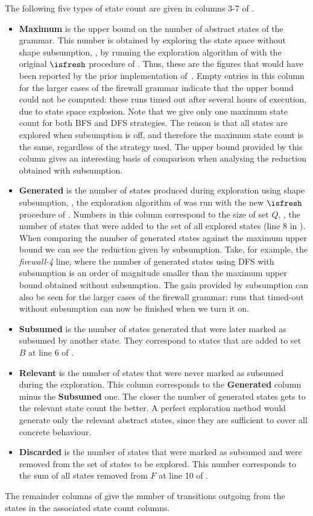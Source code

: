 The following five types of state count are given in columns 3-7 of
.
\begin{itemize}
\item {\bf Maximum} is the upper bound on the number of abstract states of the
grammar. This number is obtained by exploring the state space without shape
subsumption, \ie, by running the exploration algorithm of 
with the original $\isfresh$ procedure of . Thus, these are the
figures that would have been reported by the prior implementation
of~\cite{RZ10}. Empty entries in
this column for the larger cases of the firewall grammar indicate that the
upper bound could not be computed: these runs timed out after several hours of
execution, due to state space explosion. Note that we give only one maximum
state count for both BFS and DFS strategies. The reason is that all states are
explored when subsumption is off, and therefore the maximum state count is
the same, regardless of the strategy used. The upper bound provided by this
column gives an interesting basis of comparison when analysing the reduction
obtained with subsumption.
\item {\bf Generated} is the number of states produced during exploration using
shape subsumption, \ie, the exploration algorithm of  was run 
with the new $\isfresh$ procedure of . Numbers in this
column correspond to the size of set $Q$, \ie, the number of states that were
added to the set of all explored states (line 8 in ). When
comparing the number of generated states against the maximum upper bound we can
see the reduction given by subsumption. Take, for example, the
\emph{firewall-4} line, where the number of generated states using DFS with
subsumption is an order of magnitude smaller than the maximum upper bound
obtained without subsumption. The gain provided by subsumption can also be seen
for the larger cases of the firewall grammar: runs that timed-out without
subsumption can now be finished when we turn it on.
\item {\bf Subsumed} is the number of states generated that were later marked
as subsumed by another state. They correspond to states that are added to set
$B$ at line 6 of .
\item {\bf Relevant} is the number of states that were never marked as subsumed
during the exploration. This column corresponds to the {\bf Generated} column
minus the {\bf Subsumed} one. The closer the number of generated states gets to
the relevant state count the better. A perfect exploration method would generate
only the relevant abstract states, since they are sufficient to cover all
concrete behaviour.
\item {\bf Discarded} is the number of states that were marked as subsumed and
were removed from the set of states to be explored. This number corresponds to
the sum of all states removed from $F$ at line 10 of .
\end{itemize}
The remainder columns of  give the number of transitions outgoing
from the states in the associated state count columns.

